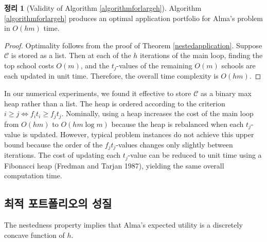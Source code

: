 \documentclass[12pt]{article} %
\newif\ifen
\newtheorem{theorem}{Theorem}
\theoremstyle{definition}
\newtheorem{theorem}{정리}
\theoremstyle{definition}
\begin{document}
\begin{theorem}[Validity of Algorithm \ref{algorithmforlargeh}]
Algorithm \ref{algorithmforlargeh} produces an optimal application portfolio for Alma's problem in $O(h m)$ time.
\end{theorem}
\begin{proof}
Optimality follows from the proof of Theorem \ref{nestedapplication}. Suppose $\mathcal{C}$ is stored as a list. Then at each of the $h$ iterations of the main loop, finding the top school costs $O(m)$, and the $t_j$-values of the remaining $O(m)$ schools are each updated in unit time. Therefore, the overall time complexity is $O(h m)$.
\end{proof}

In our numerical experiments,
we found it effective to store $\mathcal{C}$ as a binary max heap rather than a list. The heap is ordered according to the criterion $i \geq j \iff f_i t_i \geq f_j t_j$. Nominally, using a heap increases the cost of the main loop from $O(h m)$ to $O(hm \log m)$ because the heap is rebalanced when each $t_j$-value is updated. However, typical problem instances do not achieve this upper bound because the order of the $f_j t_j$-values changes only slightly between iterations. The cost of updating each $t_j$-value can be reduced to unit time using a Fibonacci heap (Fredman and Tarjan 1987), yielding the same overall computation time. 

\ifen \subsection{Properties of the optimal portfolios} \else\subsection{최적 포트폴리오의 성질} \fi
The nestedness property implies that Alma's expected utility is a discretely concave function of $h$.
\end{document}
